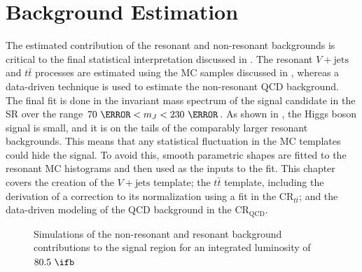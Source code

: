 \chapter{Background Estimation} \label{chap:background}

The estimated contribution of the resonant and non-resonant backgrounds is
critical to the final statistical interpretation discussed in  .
The resonant $V+\text{jets}$ and $t\bar{t}$ processes are estimated using the
MC samples discussed in , whereas a data-driven technique
is used to estimate the non-resonant QCD background. The final fit is done in
the invariant mass spectrum of the signal candidate in the SR over the range
$70~\GeV < m_{J} < 230~\GeV$.  As shown in ,
the Higgs boson signal is small, and it is on the tails of the comparably
larger resonant backgrounds.  This means that any statistical fluctuation in
the MC templates could hide the signal.  To avoid this, smooth parametric
shapes are fitted to the resonant MC histograms and then used as the inputs to
the fit.  This chapter covers the creation of the $V+\text{jets}$ template; the
$t\bar{t}$ template, including the derivation of a correction to its
normalization using a fit in the $\text{CR}_{t\bar{t}}$; and the data-driven
modeling of the QCD background in the $\text{CR}_{\text{QCD}}$.

\begin{figure}[!htbp]
  \centering
   \hfill
  \caption{Simulations of the non-resonant and resonant background contributions to the signal region for an integrated luminosity of $80.5~\ifb$}
  \label{simulated_background_shapes}
\end{figure}





